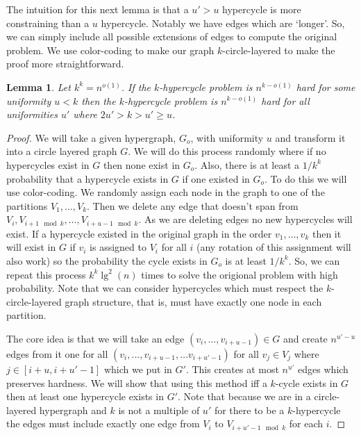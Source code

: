 \documentclass[11pt,letterpaper,pdftex]{article}
\newtheorem{lemma}[theorem]{Lemma}
\begin{document}
The intuition for this next lemma is that a $u' > u$ hypercycle is more constraining than a $u$ hypercycle. Notably we have edges which are `longer'. So, we can simply include all possible extensions of edges to compute the original problem. We use color-coding to make our graph $k$-circle-layered to make the proof more straightforward. 

\begin{lemma}
Let $k^k = n^{o(1)}$.
If the $k$-hypercycle problem is $n^{k-o(1)}$ hard for some uniformity $u < k$ then the $k$-hypercycle problem is  $n^{k-o(1)}$ hard for all uniformities $u'$ where $2u' > k > u' \geq u$.
\label{lem:growUniformityFree}
\end{lemma}
\begin{proof}

We will take a given hypergraph, $G_o$, with uniformity $u$ and transform it into a circle layered graph $G$. We will do this process randomly where if no hypercycles exist in $G$ then none exist in $G_o$. Also, there is at least a $1/k^k$ probability that a hypercycle exists in $G$ if one existed in $G_o$. To do this we will use color-coding. We randomly assign each node in the graph to one of the partitions $V_1, \ldots, V_k$. Then we delete any edge that doesn't span from $V_i, V_{i+1 \mod k}, \ldots, V_{i+u-1 \mod k}$. As we are deleting edges no new hypercycles will exist. If a hypercycle existed in the original graph in the order $v_1, \ldots, v_k$ then it will exist in $G$ if $v_i$ is assigned to $V_i$ for all $i$ (any rotation of this assignment will also work) so the probability the cycle exists in $G_o$ is at least $1/k^k$. So, we can repeat this process $k^k \lg^2(n)$ times to solve the origional problem with high probability. Note that we can consider hypercycles which must respect the $k$-circle-layered graph structure, that is, must have exactly one node in each partition. 

The core idea is that we will take an edge $(v_i,...,v_{i+u-1}) \in G$ and create $n^{u'-u}$ edges from it one for all $(v_i,...,v_{i+u-1}, \ldots v_{i+u'-1})$ for all $v_j \in V_j$ where $j \in [i+u, i+u'-1]$ which we put in $G'$. This creates at most $n^{u'}$ edges which preserves hardness. We will show that using this method iff a $k$-cycle exists in $G$ then at least one hypercycle exists in $G'$. Note that because we are in a circle-layered hypergraph and $k$ is not a multiple of $u'$ for there to be a $k$-hypercycle the edges must include exactly one edge from $V_i$ to $V_{i+u'-1 \mod k}$ for each $i$. 


\end{proof}
\end{document}
